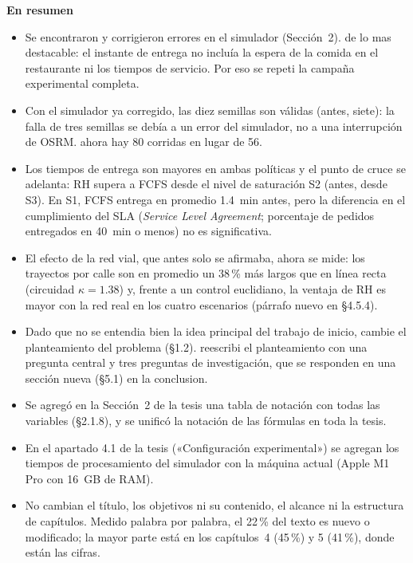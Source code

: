 \documentclass[11pt,letterpaper]{article}
\begin{document}
\noindent\colorbox{caja}{\parbox{\dimexpr\textwidth-2\fboxsep}{\vspace{4pt}
\textbf{\sffamily En resumen}
\begin{itemize}\setlength{\itemsep}{2pt}\setlength{\topsep}{2pt}
\item Se encontraron y corrigieron errores en el simulador (Sección~2). de lo mas destacable: el instante de entrega
  no incluía la espera de la comida en el restaurante ni los tiempos de servicio. Por eso se repeti la campaña
  experimental completa.
\item Con el simulador ya corregido, las diez semillas son válidas (antes, siete): la falla de tres semillas se debía
  a un error del simulador, no a una interrupción de OSRM. ahora hay 80 corridas en lugar de 56.
\item Los tiempos de entrega son mayores en ambas políticas y el punto de cruce se adelanta: RH supera a FCFS
  desde el nivel de saturación S2 (antes, desde S3). En S1, FCFS entrega en promedio 1.4~min antes, pero la diferencia en el cumplimiento del SLA
  (\textit{Service Level Agreement}; porcentaje de pedidos entregados en 40~min o menos) no es significativa.
\item El efecto de la red vial, que antes solo se afirmaba, ahora se mide: los trayectos por calle son en promedio
  un 38\,\% más largos que en línea recta (circuidad $\kappa = 1.38$) y, frente a un control euclidiano, la ventaja
  de RH es mayor con la red real en los cuatro escenarios (párrafo nuevo en §4.5.4).
\item Dado que no se entendia bien la idea principal del trabajo de inicio, cambie el planteamiento del
  problema (§1.2). reescribi el planteamiento con una pregunta central y tres preguntas de investigación, que se responden en
  una sección nueva (§5.1) en la conclusion.
\item Se agregó en la Sección~2 de la tesis una tabla de notación con todas las variables (§2.1.8), y se
  unificó la notación de las fórmulas en toda la tesis.
\item En el apartado 4.1 de la tesis («Configuración experimental») se agregan los tiempos de procesamiento del
  simulador con la máquina actual (Apple M1 Pro con 16~GB de RAM).
\item No cambian el título, los objetivos ni su contenido, el alcance ni la estructura de capítulos. Medido palabra
  por palabra, el 22\,\% del texto es nuevo o modificado; la mayor parte está en los capítulos~4 (45\,\%) y 5
  (41\,\%), donde están las cifras.
\end{itemize}\vspace{2pt}}}
\end{document}
